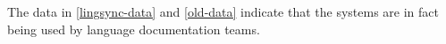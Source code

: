 \documentclass[11pt]{article}
\begin{document}
The data in \autoref{lingsync-data} and \autoref{old-data} indicate that the systems are in fact being used by language documentation teams. 

%
%
%
%
%
\end{document}
